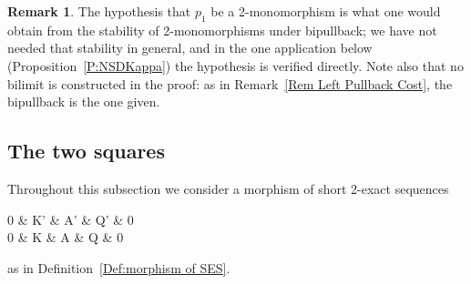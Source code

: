 \documentclass[reqno,a4paper]{amsart}
\numberwithin{equation}{section}
\theoremstyle{plain}
\theoremstyle{definition}
\newtheorem{remark}[subsection]{Remark}
\def\nameit#1{\textrm{#1}~}
\def\prox{\nameit{Proposition}}
\def\defx{\nameit{Definition}}
\def\remx{\nameit{Remark}}
\def\phi{\varphi}
\renewcommand{\1}{\onecat{1}}
\begin{document}
\begin{remark}\label{Rem Bipullback Mono}
	The hypothesis that \(p_1\) be a 2-monomorphism is what one would obtain from the stability of 2-monomorphisms under bipullback; we have not needed that stability in general, and in the one application below (\prox\ref{P:NSDKappa}) the hypothesis is verified directly. Note also that no bilimit is constructed in the proof: as in \remx\ref{Rem Left Pullback Cost}, the bipullback is the one given.
\end{remark}


\subsection{The two squares}\label{SS:Squares}

Throughout this subsection we consider a morphism of short 2-exact sequences
\begin{cd}[5][5]
	0 \& {K'} \& {A'} \& {Q'} \& 0 \\
	0 \& K \& A \& Q \& 0
	\arrow[from=1-1, to=1-2]
	\arrow["{k'}", from=1-2, to=1-3]
	\arrow[""{name=0, anchor=center, inner sep=0}, "{f}"', from=1-2, to=2-2]
	\arrow["{q'}", from=1-3, to=1-4]
	\arrow[""{name=1, anchor=center, inner sep=0}, "{g}", from=1-3, to=2-3]
	\arrow[from=1-4, to=1-5]
	\arrow[""{name=2, anchor=center, inner sep=0}, "{h}", from=1-4, to=2-4]
	\arrow[from=2-1, to=2-2]
	\arrow["k"', from=2-2, to=2-3]
	\arrow["q"', from=2-3, to=2-4]
	\arrow[from=2-4, to=2-5]
	\arrow["\phi_K"{inner sep=1.1ex},shift right=1, iso, from=0, to=1]
	\arrow["\phi_Q"{inner sep=1.1ex},shift right=1, iso, from=1, to=2]
\end{cd}
as in \defx\ref{Def:morphism of SES}.
\end{document}
